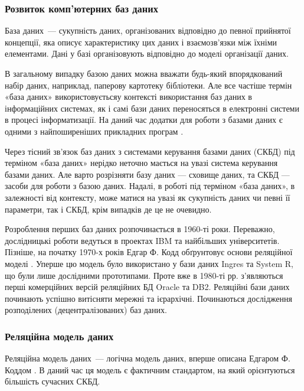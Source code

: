 \subsubsection{Розвиток комп’ютерних баз даних}

База даних~--- сукупність даних, організованих відповідно до певної прийнятої концепції, яка описує характеристику цих даних і взаємозв'язки між їхніми елементами. Дані у базі організовують відповідно до моделі організації даних. 

В загальному випадку базою даних можна вважати будь-який впорядкований набір даних, наприклад, паперову картотеку бібліотеки. Але все частіше термін «база даних» використовуєтьсяу контексті використання баз даних в інформаційних системах, як і самі бази даних переносяться в електронні системи в процесі інформатизації. На даний час додатки для роботи з базами даних є одними з найпоширеніших прикладних програм \cite{ситник2004проектування}.

Через тісний зв'язок баз даних з системами керування базами даних (СКБД) під терміном «база даних» нерідко неточно мається на увазі система керування базами даних. Але варто розрізняти базу даних — сховище даних, та СКБД — засоби для роботи з базою даних. Надалі, в роботі під терміном «база даних», в залежності від контексту, може матися на увазі як сукупність даних чи певні її параметри, так і СКБД, крім випадків де це не очевидно.

Розроблення перших баз даних розпочинається в 1960-ті роки. Переважно, дослідницькі роботи ведуться в проектах IBM та найбільших університетів. Пізніше, на початку 1970-х років Едгар Ф. Кодд обґрунтовує основи реляційної моделі \cite{codd1970relational}. Уперше цю модель було використано у бази даних Ingres та System R, що були лише дослідними прототипами. Проте вже в 1980-ті рр. з’являються перші комерційних версій реляційних БД Oracle та DB2. Реляційні бази даних починають успішно витісняти мережні та ієрархічні. Починаються дослідження розподілених (децентралізованих) баз даних.

\subsubsection{Реляційна модель даних}\label{subsection:relationModel}

Реляційна модель даних~--- логічна модель даних, вперше описана Едгаром Ф. Коддом \cite{codd1970relational}. В даний час ця модель є фактичним стандартом, на який орієнтуються більшість сучасних СКБД.

